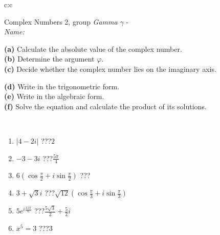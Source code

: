 \documentclass[10pt]{report}
\begin{document}
\newpage
\thispagestyle{empty}
\begin{tabular}{c:c}
\begin{minipage}[c][104.5mm][t]{0.5\linewidth}
\begin{center}
\vspace{5mm}
{\huge Complex Numbers 2, group \textit{Gamma $\gamma$} -}\\[5mm]
\textit{Name:}\phantom{xxxxxxxxxxxxxxxxxxxxxxxxxxxxxxxxxxxxxxxxxxxxxxxxxxxxxxxxxxxxxxxxx}\\[5mm]
\begin{minipage}{0.95\linewidth}
\begin{center}
{\small \begin{minipage}{0.44\textwidth} \raggedright
\textbf{(a)} Calculate the absolute value of the complex number. \\[1mm]
\textbf{(b)} Determine the argument \(\varphi\). \\[1mm]
\textbf{(c)} Decide whether the complex number lies on the imaginary axis. \end{minipage} \begin{minipage}{0.54\textwidth}
\textbf{(d)} Write in the trigonometric form. \\[1mm]
\textbf{(e)} Write in the algebraic form. \\[1mm]
\textbf{(f)} Solve the equation and calculate the product of its solutions.
\end{minipage}
}
\end{center}
\end{minipage}
\\[1mm]
\begin{minipage}{0.79\linewidth}
\begin{center}
\begin{varwidth}{\linewidth}
\setlength{\itemsep}{0pt}
\begin{enumerate}
\large
\item $|4-2i|$\quad \dotfill\; ???\;\dotfill \quad $2$
\item $-3-3i$\quad \dotfill\; ???\;\dotfill \quad $\frac{5\pi}{4}$
\item $6\left(\cos{\frac{\pi}{2}}+i\sin{\frac{\pi}{2}}\right)$\quad \dotfill\; ???\;\dotfill \quad {}
\item $3+\sqrt{3}i$\quad \dotfill\; ???\;\dotfill \quad $\sqrt{12}\left(\cos{\frac{\pi}{3}}+i\sin{\frac{\pi}{3}}\right)$
\item $5e^{i\frac{11\pi}{6}}$\quad \dotfill\; ???\;\dotfill \quad $\frac{5\sqrt{3}}{2}+\frac{5}{2}i$
\item $x^5=3$\quad \dotfill\; ???\;\dotfill \quad $3$

\end{enumerate}
\end{varwidth}
\end{center}
\end{minipage}
\end{center}
\end{minipage}
\end{tabular}
\end{document}
